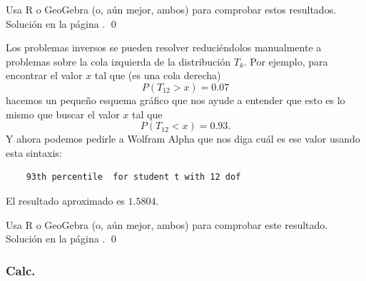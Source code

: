 \documentclass[10pt,a4paper]{article}\usepackage[]{graphicx}\usepackage[]{color}
\newcounter {cont01}
\begin{document}
\begin{ejercicio}
\label{tut06:ejercicio11}
Usa R o GeoGebra (o, aún mejor, ambos) para comprobar estos resultados. Solución en la página \pageref{tut06:ejercicio11:sol}.
\qed
\end{ejercicio}

Los problemas inversos se pueden resolver reduciéndolos manualmente a problemas sobre la cola izquierda de la distribución $T_k$. Por ejemplo, para encontrar el valor $x$ tal que (es una cola derecha)
\[P(T_{12} > x) = 0.07\]
hacemos un pequeño esquema gráfico que nos ayude a entender que esto es lo mismo que buscar el valor $x$ tal que
\[P(T_{12} < x) = 0.93.\]
Y ahora podemos pedirle a Wolfram Alpha que nos diga cuál es ese valor usando esta sintaxis:
\begin{center}
  \begin{verbatim}
    93th percentile  for student t with 12 dof
  \end{verbatim}
\end{center}
El resultado aproximado es $1.5804$.

\begin{ejercicio}
\label{tut06:ejercicio12}
Usa R o GeoGebra (o, aún mejor, ambos) para comprobar este resultado. Solución en la página \pageref{tut06:ejercicio12:sol}.
\qed
\end{ejercicio}

\subsubsection{Calc.}
\label{tut06:subsubsec:StudentConCalc}
\end{document}
